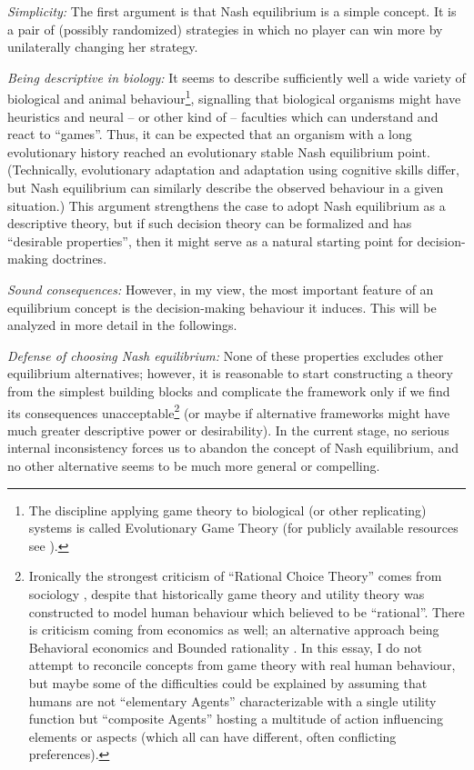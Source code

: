 \documentclass{article}
\begin{document}
{\it Simplicity:}
The first argument is that Nash equilibrium is a simple concept. It is a pair of (possibly randomized) strategies in which no player can win more by unilaterally changing her strategy.

{\it Being descriptive in biology:}
It seems to describe sufficiently well a wide variety of biological and animal behaviour\footnote{The discipline applying game theory to biological (or other replicating) systems is called Evolutionary Game Theory \cite{book:EvolutionaryGames,book:DarwinianDynamics} (for publicly available resources see \cite{sep:EvolutionaryGameTheory,thesis:GameTheoreticModelsOfAnimalBehavior}).}, signalling that biological organisms might have heuristics and neural -- or other kind of -- faculties which can understand and react to ``games''. Thus, it can be expected that an organism with a long evolutionary history reached an evolutionary stable Nash equilibrium point. (Technically, evolutionary adaptation and adaptation using cognitive skills differ, but Nash equilibrium can similarly describe the observed behaviour in a given situation.)
This argument strengthens the case to adopt Nash equilibrium as a descriptive theory, but if such decision theory can be formalized and has ``desirable properties'', then it might serve as a natural starting point for decision-making doctrines.

{\it Sound consequences:}
However, in my view, the most important feature of an equilibrium concept is the decision-making behaviour it induces. This will be analyzed in more detail in the followings.

{\it Defense of choosing Nash equilibrium:}
None of these properties excludes other equilibrium alternatives; however, it is reasonable to start constructing a theory from the simplest building blocks and complicate the framework only if we find its consequences unacceptable\footnote{Ironically the strongest criticism of ``Rational Choice Theory'' comes from sociology \cite{paper:BeyondRationalChoiceTheory}, despite that historically game theory and utility theory was constructed to model human behaviour which believed to be ``rational''. There is criticism coming from economics as well; an alternative approach being Behavioral economics \cite{paper:Tversky,book:Tversky} and Bounded rationality \cite{sep:BoundedRationality}. In this essay, I do not attempt to reconcile concepts from game theory with real human behaviour, but maybe some of the difficulties could be explained by assuming that humans are not ``elementary Agents'' characterizable with a single utility function but ``composite Agents'' hosting a multitude of action influencing elements or aspects (which all can have different, often conflicting preferences).} (or maybe if alternative frameworks might have much greater descriptive power or desirability).
In the current stage, no serious internal inconsistency forces us to abandon the concept of Nash equilibrium, and no other alternative seems to be much more general or compelling.
\end{document}
